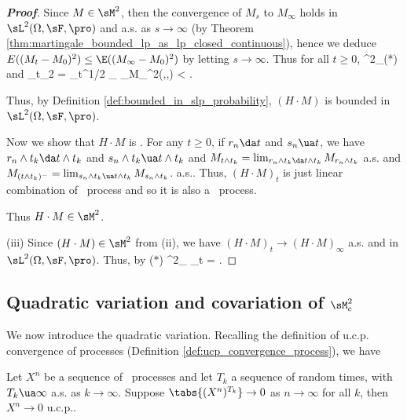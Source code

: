 \begin{proof}[\bf Proof]
Since $M \in \sM^2$, then the convergence of $M_s$ to $M_\infty$ holds in $\sL^2(\Omega,\sF,\pro)$ and a.s. as $s \to \infty$ (by Theorem \ref{thm:martingale_bounded_lp_as_lp_closed_continuous}), hence we deduce $E((M_t -M_0)^2) \leq \E((M_\infty -M_0)^2)$ by letting $s \to \infty$. Thus for all $t \geq 0$,
\be
\E{} \leq {}^2_\infty \E{}\quad \quad (*)
\ee
and
\be
\sup_{t}_2 = \sup_{t}^{1/2} \leq {}_{} _{M_\infty \in \sL^2(\Omega,\sF,\pro)} < \infty.
\ee

Thus, by Definition \ref{def:bounded_in_slp_probability}, $(H \cdot M)$ is bounded in $\sL^2(\Omega,\sF,\pro)$.

Now we show that $H \cdot M$ is \cadlag. For any $t\geq 0$, if $r_n \da t$ and $s_n \ua t$, we have $r_n\land t_k \da t\land t_k $ and $s_n \land t_k \ua t \land t_k$ and $M_{t\land t_k} = \lim_{r_n \land t_k \da t\land t_k} M_{r_n\land t_k}$ a.s. and $M_{(t\land t_k)^-} = \lim_{s_n\land t_k \ua t\land t_k} M_{s_n\land t_k}$. a.s.. Thus, $(H\cdot M)_t$ is just linear combination of \cadlag\ process and so it is also a \cadlag\ process.

Thus $H \cdot M \in \sM^2$.

\item [(iii)] Since $(H \cdot M) \in \sM^2$ from (ii), we have $(H \cdot M)_t \to (H \cdot M)_\infty$ a.s. and in $\sL^2(\Omega,\sF,\pro)$. Thus, by ($*$)
\be
{}^2_\infty \E{} \geq \lim_{t\to \infty} \E{} = \E{}.
\ee%
\een
\end{proof}

\subsection{Quadratic variation and covariation of $\sM_c^2$}

We now introduce the quadratic variation. Recalling the definition of u.c.p. convergence of processes (Definition \ref{def:ucp_convergence_process}), we have

\begin{proposition}
Let $X^n$ be a sequence of \cadlag\ processes and let $T_k$ a sequence of random times, with $T_k \ua \infty$ a.s. as $k \to\infty$. Suppose
$\tabs{(X^n)^{T_k}} \to 0$ as $n\to\infty$ for all $k$, then $X^n \to 0$ u.c.p..
\end{proposition}

